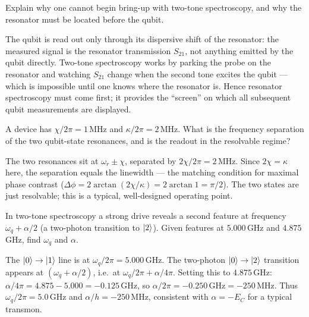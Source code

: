 \begin{exercise}
Explain why one cannot begin bring-up with two-tone spectroscopy, and
why the resonator must be located before the qubit.
\begin{solution}
The qubit is read out only through its dispersive shift of the
resonator: the measured signal is the resonator transmission $S_{21}$,
not anything emitted by the qubit directly. Two-tone spectroscopy works
by parking the probe on the resonator and watching $S_{21}$ change when
the second tone excites the qubit --- which is impossible until one
knows where the resonator is. Hence resonator spectroscopy must come
first; it provides the ``screen'' on which all subsequent qubit
measurements are displayed.
\end{solution}
\end{exercise}

\begin{exercise}
A device has $\chi/2\pi=1\,$MHz and $\kappa/2\pi=2\,$MHz. What is the
frequency separation of the two qubit-state resonances, and is the
readout in the resolvable regime?
\begin{solution}
The two resonances sit at $\omega_r\pm\chi$, separated by
$2\chi/2\pi=2\,$MHz. Since $2\chi=\kappa$ here, the separation equals
the linewidth --- the matching condition for maximal phase contrast
($\Delta\phi=2\arctan(2\chi/\kappa)=2\arctan1=\pi/2$). The two states are
just resolvable; this is a typical, well-designed operating point.
\end{solution}
\end{exercise}

\begin{exercise}
In two-tone spectroscopy a strong drive reveals a second feature at
frequency $\omega_q+\alpha/2$ (a two-photon transition to $\ket2$).
Given features at $5.000\,$GHz and $4.875\,$GHz, find $\omega_q$ and
$\alpha$.
\begin{solution}
The $\ket0\to\ket1$ line is at $\omega_q/2\pi=5.000\,$GHz. The
two-photon $\ket0\to\ket2$ transition appears at
$(\omega_q+\alpha/2)$, i.e.\ at $\omega_q/2\pi+\alpha/4\pi$. Setting
this to $4.875\,$GHz: $\alpha/4\pi=4.875-5.000=-0.125\,$GHz, so
$\alpha/2\pi=-0.250\,$GHz$=-250\,$MHz. Thus $\omega_q/2\pi=5.0\,$GHz and
$\alpha/h=-250\,$MHz, consistent with $\alpha=-E_C$ for a typical
transmon.
\end{solution}
\end{exercise}

